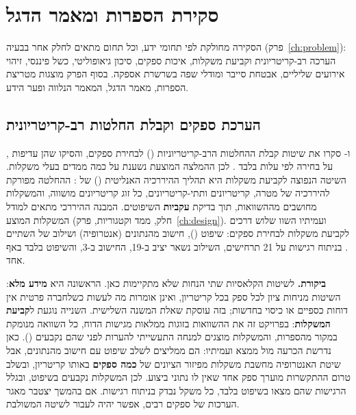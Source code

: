 \chapter{סקירת הספרות ומאמר הדגל}\label{ch:literature}

הסקירה מחולקת לפי תחומי ידע, וכל תחום מתאים לחלק אחר בבעיה (פרק~\ref{ch:problem}): הערכה רב-קריטריונית וקביעת משקלות, איכות ספקים, סיכון גיאופוליטי, כשל פיננסי, זיהוי אירועים שליליים, אבטחת סייבר ומודלי שפה בשרשרת אספקה. בסוף הפרק מוצגות מטריצת הספרות, מאמר הדגל, המאמר הנלווה ופער הידע.

\section{הערכת ספקים וקבלת החלטות רב-קריטריונית}\label{sec:lit-mcdm}

,  ו- סקרו את שיטות קבלת ההחלטות הרב-קריטריוניות () לבחירת ספקים, והסיקו שהן עדיפות על בחירה לפי עלות בלבד \cite{ho2010}. לכן ההמלצה המוצעת נשענת על כמה ממדים בעלי משקלות. השיטה הנפוצה לקביעת משקלות היא תהליך ההיררכיה האנליטית () של  \cite{saaty1990}: ההחלטה מפורקת להיררכיה של מטרה, קריטריונים ותתי-קריטריונים, כל זוג קריטריונים מושווה, והמשקלות מחושבים מההשוואות, תוך בדיקת \textbf{עקביות} השיפוטים. המבנה ההיררכי מתאים למודל המשקלות המוצע (חלק, ממד וקטגוריות, פרק~\ref{ch:design}).  ועמיתיו השוו שלוש דרכים לקביעת משקלות לבחירת ספקים: שיפוט (), חישוב מהנתונים (אנטרופיה) ושילוב של השתיים \cite{boukrouh2024}. בניתוח רגישות על 21 תרחישים, השילוב נשאר יציב ב-19, החישוב ב-3, והשיפוט בלבד באף אחד.

\textbf{ביקורת.} לשיטות הקלאסיות שתי הנחות שלא מתקיימות כאן. הראשונה היא \textbf{מידע מלא}: השיטות מניחות ציון לכל ספק בכל קריטריון, ואינן אומרות מה לעשות כשלחברה פרטית אין דוחות כספיים או כיסוי בחדשות; בזה עוסקת שאלת המשנה השלישית. השנייה נוגעת ל\textbf{קביעת המשקלות}: בפרויקט זה את ההשוואות בזוגות ממלאות מגישות הדוח, כל השוואה מנומקת במקור מהספרות, והמשקלות מוצגים למנחה התעשייתי להערות לפני שהם נקבעים (). כאן נדרשת הכרעה מול ממצא  ועמיתיו: הם ממליצים לשלב שיפוט עם חישוב מהנתונים, אבל שיטת האנטרופיה מחשבת משקלות מפיזור הציונים של \textbf{כמה ספקים} באותו קריטריון, ובשלב טרום ההתקשרות מוערך ספק אחד שאין לו נתוני ביצוע. לכן המשקלות נקבעים בשיפוט, ובגלל הרגישות שהם מצאו בשיפוט בלבד, כל משקל נבדק בניתוח רגישות. אם בהמשך יצטבר מאגר הערכות של ספקים רבים, אפשר יהיה לעבור לשיטה המשולבת.

